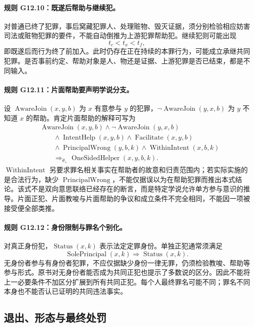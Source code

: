 \paragraph{规则 G12.10：既遂后帮助与继续犯。}
对普通已终了犯罪，事后窝藏犯罪人、处理赃物、毁灭证据，须分别检验相应妨害司法或赃物犯罪的要件，不能自动倒推为上游犯罪帮助犯。继续犯则可能出现
\[
 t_c<t_x<t_f,
\]
即既遂后而行为终了前加入。此时仍存在正在持续的本罪行为，可能成立承继共同犯罪。是否事前约定、帮助对象是人、物还是证据、上游犯罪是否已结束，都是不同输入。

\paragraph{规则 G12.11：片面帮助要声明学说分支。}
设 $\operatorname{AwareJoin}(x,y,b)$ 为 $x$ 有意参与 $y$ 的犯罪，$\neg\operatorname{AwareJoin}(y,x,b)$ 为 $y$ 不知道 $x$ 的帮助。肯定片面帮助的解释可写为
\[
\begin{aligned}
&\operatorname{AwareJoin}(x,y,b)\land\neg\operatorname{AwareJoin}(y,x,b)\\
&\qquad\land\operatorname{IntentHelp}(x,y,b)\land\operatorname{Facilitate}(x,y,b)\\
&\qquad\land\operatorname{PrincipalWrong}(y,b,k)\land\operatorname{WithinIntent}(x,b,k)\\
&\qquad\Longrightarrow_{\theta_{+}}\operatorname{OneSidedHelper}(x,y,b,k).
\end{aligned}
\]
$\operatorname{WithinIntent}$ 另要求罪名相关事实在帮助者的故意和归责范围内；若实际实施的是合法行为，缺少 $\operatorname{PrincipalWrong}$，不能仅据误以为在帮助犯罪而推出本式结论。该式不是双向意思联络已经存在的断言，而是特定学说允许单方参与意识的推导。片面正犯、片面教唆与片面帮助的争议和成立条件不完全相同，不能因一项被接受便全部类推。

\paragraph{规则 G12.12：身份限制与罪名个别化。}
对真正身份犯，$\operatorname{Status}(x,k)$ 表示法定定罪身份。单独正犯通常须满足
\[
\operatorname{SolePrincipal}(x,k)\Longrightarrow\operatorname{Status}(x,k).
\]
无身份者参与有身份者犯罪，不应仅据缺少身份一律无罪，仍须检验教唆、帮助等参与形式。原书对无身份者能否成为共同正犯也提示了多数说的区分。因此不能将上一必要条件不加区分扩展到所有共同正犯。每个人最终罪名可能不同；罪名不同本身也不能否认已证明的共同违法事实。

\subsection{退出、形态与最终处罚}
